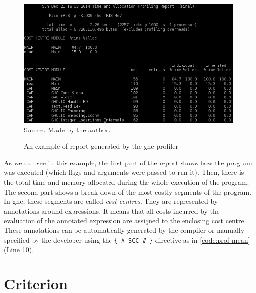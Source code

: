 \begin{figure}[htp]
  \centering
  \caption{An example of report generated by the \ac{ghc} profiler}
  \includegraphics[width=\columnwidth]{images/profiler-placeholder}
  \footnotesize{Source: Made by the author.}
  \label{fig:profiler-sample}
\end{figure}

As we can see in this example, the first part of the report shows how the program was executed (which flags and arguments were passed to run it). Then, there is the total time and memory allocated during the whole execution of the program. The second part shows a break-down of the most costly segments of the program. In \ac{ghc}, these segments are called \emph{cost centres}. They are represented by annotations around expressions. It means that all costs incurred by the evaluation of the annotated expression are assigned to the enclosing cost centre. These annotations can be automatically generated by the compiler or manually specified by the developer using the \texttt{\{-\# SCC \#-\}} directive as in \autoref{code:prof-mean} (Line 10).

\section{Criterion}\label{sec:criterion}
\lipsum[1-4]
